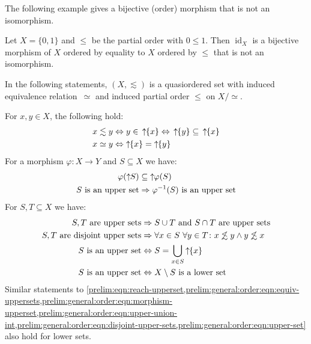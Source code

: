 The following example gives a  
bijective (order) morphism that is not an isomorphism.

\begin{example}\label{prelim:ex:order:bijmorph}
	Let $X = \{0,1\}$ and $\le$ be the partial order with $0 \le 1$. Then $\operatorname{id}_X$
	is a bijective morphism of $X$ ordered by equality to $X$ ordered by $\le$
	that is not an isomorphism.
\end{example}

In the following statements, $(X, \lesssim)$ is a quasiordered set with induced equivalence relation~$\simeq$
and induced partial order $\le$ on $X / {\simeq}$. 

For $x,y \in X$, the following hold:
\begin{align} 
	x \lesssim y & \Leftrightarrow y \in \,\upperset{\{x\}} 
	\Leftrightarrow \,\upperset{\{ y \}} \subseteq \,\upperset{\{ x \}}  \label{prelim:eqn:reach-upperset} \\
	x \simeq y & \Leftrightarrow \upperset{\{x\}} = \upperset{\{y\}} \label{prelim:general:order:eqn:equiv-uppersets} \\
\end{align}
For a morphism $\varphi \colon X \to Y$ %
and $S \subseteq X$ we have:
\begin{align}
	\varphi(\mbox{\ensuremath{\displaystyle \uparrow \!\!S}}) & \subseteq \mbox{\ensuremath{\displaystyle \uparrow \!\!\varphi(S)}} \label{prelim:general:order:eqn:morphism-upperset} \\
	\text{$S$ is an upper set} & \Rightarrow \text{$\varphi^{-1}(S)$ is an upper set}               \label{prelim:general:order:eqn:morphism-upperset-inverse}
\end{align} 
For $S, T \subseteq X$ we have:
\begin{align}
	\text{$S, T$ are upper sets} & \Rightarrow \text{$S \cup T$ and $S \cap T$ are upper sets} \label{prelim:general:order:eqn:upper-union-int}\\
	\text{$S, T$ are disjoint upper sets} & \Rightarrow \text{$\forall x \in S \ \forall y \in T \colon x \not\lesssim y \land y \not\lesssim x$} \label{prelim:general:order:eqn:disjoint-upper-sets} \\
	\text{$S$ is an upper set} & \Leftrightarrow S = \bigcup_{x \in S} \mbox{\ensuremath{\displaystyle \uparrow \!\!\{x\}}} \label{prelim:general:order:eqn:upper-set} \\
	\text{$S$ is an upper set} & \Leftrightarrow \text{$X \setminus S$ is a lower set} \label{prelim:order:prop:upper-complement-lower} 
\end{align}
Similar statements to 
\cref{prelim:eqn:reach-upperset,prelim:general:order:eqn:equiv-uppersets,prelim:general:order:eqn:morphism-upperset,prelim:general:order:eqn:upper-union-int,prelim:general:order:eqn:disjoint-upper-sets,prelim:general:order:eqn:upper-set} 
also hold for lower sets. 


